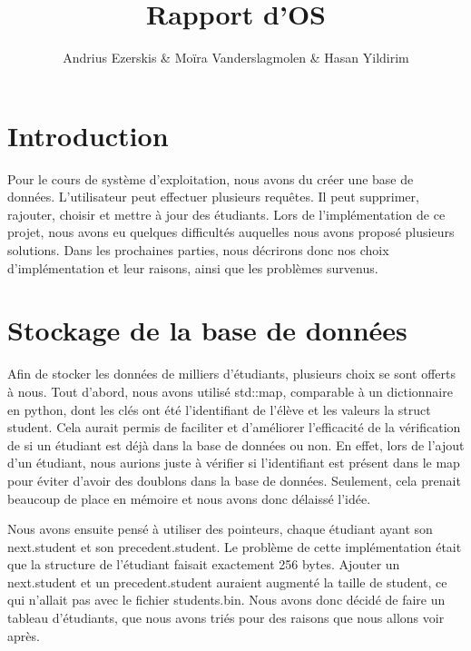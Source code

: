 \documentclass[utf8]{article}
\begin{document}
\begin{titlepage}
    

\author{Andrius Ezerskis \& Moïra Vanderslagmolen \& Hasan Yildirim}
\title{Rapport d'OS}

\maketitle
\end{titlepage}

\section{Introduction}
\par
Pour le cours de système d'exploitation, nous avons du créer une base de données. 
L'utilisateur peut effectuer plusieurs requêtes. Il peut supprimer, rajouter, choisir
et mettre à jour des étudiants. Lors de l'implémentation de ce projet, nous avons eu quelques difficultés
auquelles nous avons proposé plusieurs solutions. Dans les prochaines parties, nous décrirons donc
nos choix d'implémentation et leur raisons, ainsi que les problèmes survenus.
\par


\section{Stockage de la base de données}
\indent{}
\par
Afin de stocker les données de milliers d'étudiants, plusieurs choix se sont offerts à nous. 
Tout d'abord, nous avons utilisé std::map, comparable à un dictionnaire en python, dont les
clés ont été l'identifiant de l'élève et les valeurs la struct student. 
Cela aurait permis de faciliter et d'améliorer l'efficacité de la vérification de si un étudiant est déjà dans la base de données ou non. En effet, lors de l'ajout d'un étudiant, nous aurions juste à vérifier si l'identifiant est présent dans le map pour éviter d'avoir des doublons dans la base de données.
Seulement, cela
prenait beaucoup de place en mémoire et nous avons donc délaissé l'idée. 
\par
\indent{}
\par
Nous avons ensuite pensé à utiliser des pointeurs, chaque étudiant
ayant son next.student et son precedent.student. Le problème de cette implémentation était que la structure de l'étudiant faisait exactement 256 bytes.
Ajouter un next.student et un precedent.student auraient augmenté la taille de student, ce qui n'allait pas avec le fichier students.bin.
Nous avons donc décidé de faire un tableau d'étudiants, que nous avons triés pour des raisons que nous allons voir après.
\par
\end{document}
